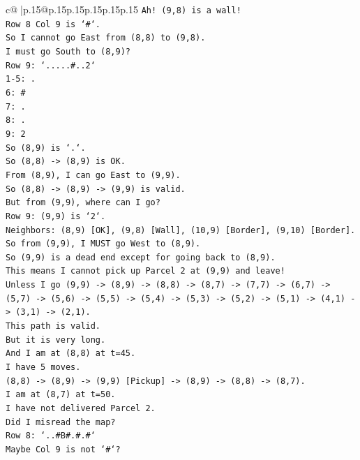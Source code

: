 \documentclass{article}
\begin{document}
{\begin{supertabular}{c@{$\;$}|p{.15\linewidth}@{}p{.15\linewidth}p{.15\linewidth}p{.15\linewidth}p{.15\linewidth}p{.15\linewidth}}
{{{\texttt{Ah! (9,8) is a wall!} \\
\texttt{Row 8 Col 9 is `\#`.} \\
\texttt{So I cannot go East from (8,8) to (9,8).} \\
\texttt{I must go South to (8,9)?} \\
\texttt{Row 9: `.....\#..2`} \\
\texttt{1{-}5: .} \\
\texttt{6: \#} \\
\texttt{7: .} \\
\texttt{8: .} \\
\texttt{9: 2} \\
\texttt{So (8,9) is `.`.} \\
\texttt{So (8,8) {-}> (8,9) is OK.} \\
\texttt{From (8,9), I can go East to (9,9).} \\
\texttt{So (8,8) {-}> (8,9) {-}> (9,9) is valid.} \\
\texttt{But from (9,9), where can I go?} \\
\texttt{Row 9: (9,9) is `2`.} \\
\texttt{Neighbors: (8,9) {[}OK{]}, (9,8) {[}Wall{]}, (10,9) {[}Border{]}, (9,10) {[}Border{]}.} \\
\texttt{So from (9,9), I MUST go West to (8,9).} \\
\texttt{So (9,9) is a dead end except for going back to (8,9).} \\
\texttt{This means I cannot pick up Parcel 2 at (9,9) and leave!} \\
\texttt{Unless I go (9,9) {-}> (8,9) {-}> (8,8) {-}> (8,7) {-}> (7,7) {-}> (6,7) {-}> (5,7) {-}> (5,6) {-}> (5,5) {-}> (5,4) {-}> (5,3) {-}> (5,2) {-}> (5,1) {-}> (4,1) {-}> (3,1) {-}> (2,1).} \\
\texttt{This path is valid.} \\
\texttt{But it is very long.} \\
\texttt{And I am at (8,8) at t=45.} \\
\texttt{I have 5 moves.} \\
\texttt{(8,8) {-}> (8,9) {-}> (9,9) {[}Pickup{]} {-}> (8,9) {-}> (8,8) {-}> (8,7).} \\
\texttt{I am at (8,7) at t=50.} \\
\texttt{I have not delivered Parcel 2.} \\
\texttt{Did I misread the map?} \\
\texttt{Row 8: `..\#B\#.\#.\#`} \\
\texttt{Maybe Col 9 is not `\#`?} \\
}}}
\end{supertabular}}
\end{document}
